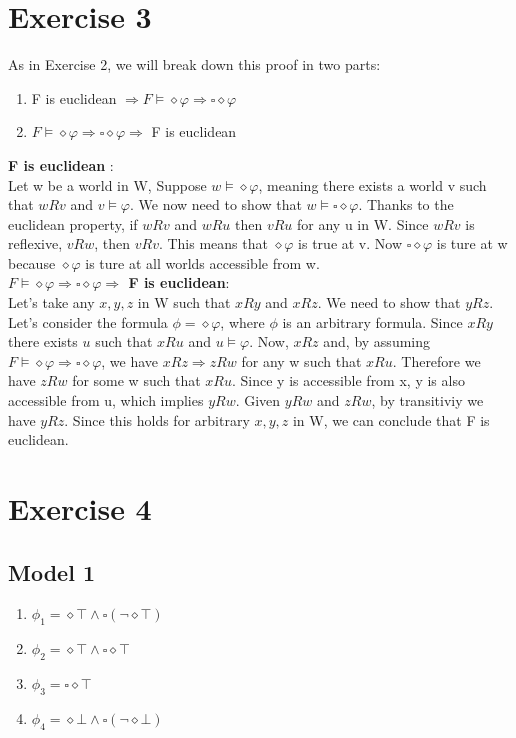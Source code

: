 \documentclass[11pt]{exam}
\begin{document}
\section*{Exercise 3}
As in Exercise 2, we will break down this proof in two parts:
\begin{enumerate}
    \item F is euclidean \(\Rightarrow F \vDash \diamond \varphi \Rightarrow \square \diamond \varphi\)
    \item \(F \vDash \diamond \varphi \Rightarrow \square \diamond \varphi \Rightarrow\) F is euclidean
\end{enumerate}
\textbf{F is euclidean} : \\
Let w be a world in W, Suppose \(w \vDash \diamond \varphi\), meaning there exists a world v such that \(wRv\) and \(v \vDash \varphi\).
We now need to show that \(w \vDash \square \diamond \varphi\). Thanks to the euclidean property, if \(wRv\) and \(wRu\) then \(vRu\) for any u in W.
Since \(wRv\) is reflexive, \(vRw\), then \(vRv\). This means that \(\diamond \varphi\) is true at v. Now \(\square \diamond \varphi\) is ture at w because \(\diamond \varphi\) is ture at all worlds accessible from w. \\
\textbf{\(F \vDash \diamond \varphi \Rightarrow \square \diamond \varphi \Rightarrow\) F is euclidean}: \\
Let's take any \(x, y, z\) in W such that \(xRy\) and \(xRz\). We need to show that \(yRz\).
Let's consider the formula \(\phi = \diamond \varphi\), where \(\phi\) is an arbitrary formula. Since \(xRy\) there exists \(u\) such that \(xRu\) and \(u \vDash \varphi\).
Now, \(xRz\) and, by assuming \(F \vDash \diamond \varphi \Rightarrow \square \diamond \varphi\), we have \(xRz \Rightarrow zRw\) for any w such that \(xRu\).
Therefore we have \(zRw\) for some w such that \(xRu\). Since y is accessible from x, y is also accessible from u, which implies \(yRw\).
Given \(yRw\) and \(zRw\), by transitiviy we have \(yRz\).
Since this holds for arbitrary \(x, y, z\) in W, we can conclude that F is euclidean.
\section*{Exercise 4}
\subsection*{Model 1}
\begin{enumerate}
    \item \(\phi_1 = \diamond \top \wedge \square (\neg \diamond \top)\)
    \item \(\phi_2 = \diamond \top \wedge \square \diamond \top\)
    \item \(\phi_3 = \square \diamond \top\)
    \item \(\phi_4 = \diamond \bot \wedge \square (\neg \diamond \bot)\)
\end{enumerate}
\end{document}
